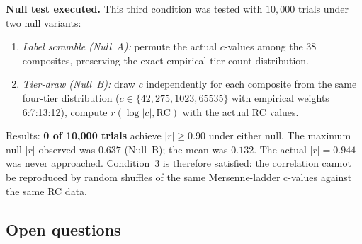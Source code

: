 \documentclass[12pt,a4paper]{article}
\newcommand{\RC}{\ensuremath{\mathrm{RC}}}
\begin{document}
\textbf{Null test executed.}
This third condition was tested with $10{,}000$ trials under two null variants:
\begin{enumerate}[leftmargin=2em,label=(\alph*)]
  \item \emph{Label scramble (Null~A):} permute the actual $c$-values among the
    38 composites, preserving the exact empirical tier-count distribution.
  \item \emph{Tier-draw (Null~B):} draw $c$ independently for each composite
    from the same four-tier distribution ($c \in \{42,275,1023,65535\}$ with
    empirical weights 6:7:13:12), compute $r(\log|c|, \RC)$ with the actual RC values.
\end{enumerate}
Results: \textbf{0 of 10{,}000 trials} achieve $|r| \geq 0.90$ under either null.
The maximum null $|r|$ observed was $0.637$ (Null~B); the mean was $0.132$.
The actual $|r| = 0.944$ was never approached.
Condition~3 is therefore satisfied: the correlation cannot be reproduced by
random shuffles of the same Mersenne-ladder c-values against the same RC data.

\subsection{Open questions}
\end{document}
